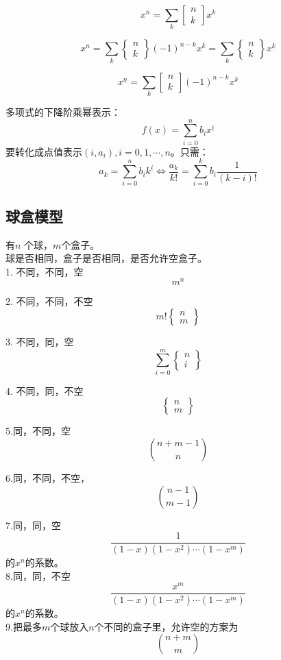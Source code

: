 \begin{proposition}
  $$
  x^{\overline{n}} =\sum_{k} \begin{bmatrix} n \\ k \end{bmatrix} x^k
  $$
\end{proposition}

\begin{proposition}
    $$
  x^{n} =\sum_{k} \begin{Bmatrix} n \\ k \end{Bmatrix} (-1)^{n-k} x^{\overline{k}}
  =\sum_{k}  \begin{Bmatrix} n \\ k \end{Bmatrix} x^{\underline{k}}
  $$
\end{proposition}

\begin{proposition}
  $$
  x^{\underline{n}}=\sum_{k} \begin{bmatrix} n \\ k \end{bmatrix} (-1)^{n-k}  x^k
  $$
\end{proposition}


\begin{proposition}
  多项式的下降阶乘幂表示：
  $$
  f(x)=\sum_{i=0}^{n} b_i x^{\underline{i}}
  $$
  要转化成点值表示$(i,a_i),i=0,1,\cdots ,n$。只需：
  $$
  a_k =\sum_{i=0}^{n} b_i k^{\underline{i}} \iff \frac{a_k}{k!}=\sum_{i=0}^{k} b_i \frac{1}{(k-i)!}
  $$
\end{proposition}

\subsection{球盒模型}
有$n$ 个球，$m$个盒子。\\
球是否相同，盒子是否相同，是否允许空盒子。\\
1. 不同，不同，空
$$
m^n
$$

2. 不同，不同，不空
$$
m! \begin{Bmatrix}n \\ m\end{Bmatrix}
$$

3. 不同，同，空
$$
\sum_{i=0}^{m} \begin{Bmatrix}n \\ i\end{Bmatrix}
$$

4. 不同，同，不空
$$
\begin{Bmatrix}n \\ m\end{Bmatrix}
$$

5.同，不同，空
$$
\binom{n+m-1}{n}
$$

6.同，不同，不空，
$$
\binom{n-1}{m-1}
$$

7.同，同，空
$$
\frac{1}{(1-x)(1-x^2)\cdots (1-x^m)}
$$
的$x^n$的系数。\\

8.同，同，不空
$$
\frac{x^m}{(1-x)(1-x^2)\cdots (1-x^m)}
$$
的$x^n$的系数。\\

9.把最多$m$个球放入$n$个不同的盒子里，允许空的方案为
$$
\binom{n+m}{m}
$$
